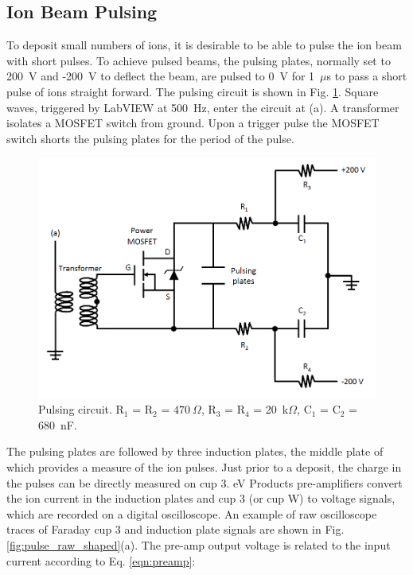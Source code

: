

\subsection{Ion Beam Pulsing}

To deposit small numbers of ions, it is desirable to be able to pulse the ion beam with short pulses.  To achieve pulsed beams, the pulsing plates, normally set to 200~V and -200~V to deflect the beam, are pulsed to 0~V for 1~$\mu$s to pass a short pulse of ions straight forward.  The pulsing circuit is shown in Fig. \ref{fig:pulse_circuit}.  Square waves, triggered by LabVIEW at 500~Hz, enter the circuit at (a). A transformer isolates a MOSFET switch from ground.  Upon a trigger pulse the MOSFET switch shorts the pulsing plates for the period of the pulse.

\begin{figure} %
        \centering
                \includegraphics[width=.85\textwidth]{figures/pulsing_circuit.png}
                \caption{Pulsing circuit.  R$_{1}$ = R$_{2}$ = $470~\Omega$, R$_{3}$ = R$_{4}$ = 20~k$\Omega$, \newline C$_{1}$ = C$_{2}$ = 680~nF. \cite{Shon}}
\label{fig:pulse_circuit}
\end{figure}

The pulsing plates are followed by three induction plates, the middle plate of which provides a measure of the ion pulses.  Just prior to a deposit, the charge in the pulses can be directly measured on cup 3.  eV Products pre-amplifiers convert the ion current in the induction plates and cup 3 (or cup W) to voltage signals, which are recorded on a digital oscilloscope.  An example of raw oscilloscope traces of Faraday cup 3 and induction plate signals are shown in Fig. \ref{fig:pulse_raw_shaped}(a).  The pre-amp output voltage is related to the input current according to Eq. \ref{eqn:preamp}:

